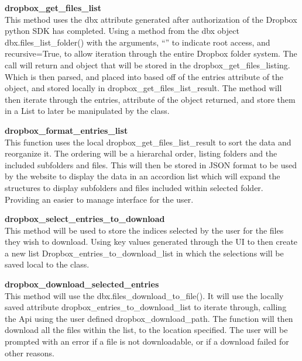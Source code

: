 \textbf{dropbox\_get\_files\_list} \\
    This method uses the dbx attribute generated after authorization of the Dropbox python SDK has completed. Using a method from the dbx object
    dbx.files\_list\_folder() with the arguments, ``'' to indicate root access, and recursive=True, to allow iteration through the entire Dropbox
    folder system. The call will return and object that will be stored in the dropbox\_get\_files\_listing. Which is then parsed, and placed into
    based off of the entries attribute of the object, and stored locally in dropbox\_get\_files\_list\_result. The method will then iterate through
    the entries, attribute of the object returned, and store them in a List to later be manipulated by the class.

\textbf{dropbox\_format\_entries\_list} \\
    This function uses the local dropbox\_get\_files\_list\_result to sort the data and reorganize it. The ordering will be a hierarchal order, listing 
    folders and the included subfolders and files. This will then be stored in JSON format to be used by the website to display the data in an
    accordion list which will expand the structures to display subfolders and files included within selected folder. Providing an easier to manage
    interface for the user.

\textbf{dropbox\_select\_entries\_to\_download} \\
    This method will be used to store the indices selected by the user for the files they wish to download. Using key values generated through 
    the UI to then create a new list Dropbox\_entries\_to\_download\_list in which the selections will be saved local to the class.

\textbf{dropbox\_download\_selected\_entries} \\
    This method will use the dbx.files\_download\_to\_file(). It will use the locally saved attribute dropbox\_entries\_to\_download\_list to
    iterate through, calling the Api using the user defined dropbox\_download\_path. The function will then download all the files within the 
    list, to the location specified. The user will be prompted with an error if a file is not downloadable, or if a download failed for other 
    reasons.

